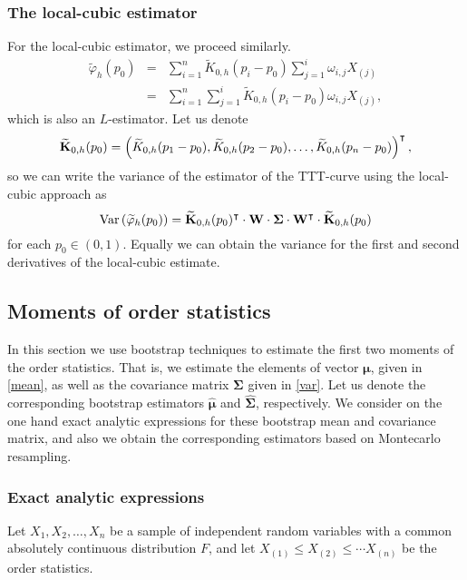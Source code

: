 \documentclass[preprint,12pt]{elsarticle}
\begin{document}
\subsubsection{The local-cubic estimator}

For the local-cubic estimator, we proceed similarly.
\begin{eqnarray*}
\widetilde{\varphi}_h(p_0)&=&\sum_{i=1}^n \widetilde{K}_{0,h}(p_i-p_0)\sum_{j=1}^i\omega_{i,j}X_{(j)} \\
&=& \sum_{i=1}^n \sum_{j=1}^i \widetilde{K}_{0,h}(p_i-p_0)\omega_{i,j}X_{(j)},
\end{eqnarray*}
which is also an $L$-estimator. Let us denote 
$$\widetilde{\bf K}_{0,h}(p_0)=\left(\widetilde{ K}_{0,h}(p_1-p_0), \widetilde{ K}_{0,h}(p_2-p_0),\ldots,\widetilde{ K}_{0,h}(p_n-p_0)\right)^{\intercal},$$
 so we can write the variance of the estimator of the TTT-curve using the local-cubic approach as
\begin{equation}\label{V.phi0.cubic}
{\rm Var} \left(\widetilde{\varphi}_h(p_0)\right)= \widetilde{\bf K}_{0,h}(p_0)^{\intercal}\cdot {\bf W} \cdot {\boldsymbol{\Sigma}}\cdot  {\bf W}^{\intercal}\cdot \widetilde{\bf K}_{0,h}(p_0)
\end{equation}
for each $p_0 \in (0,1)$. Equally we can obtain the variance for the first and second derivatives of the local-cubic estimate.

\bigskip
\subsection{Moments of order statistics}

In this section we use bootstrap techniques to estimate the first two moments of the order statistics. That is, we estimate the elements of vector $\boldsymbol{\mu}$, given in \eqref{mean}, as well as the covariance matrix $\boldsymbol{\Sigma}$ given in \eqref{var}. Let us denote the corresponding bootstrap estimators $\widehat{\boldsymbol{\mu}}$ and $\widehat{\boldsymbol{\Sigma}}$, respectively.  We consider on the one hand exact analytic expressions for these bootstrap mean and covariance matrix, and also we obtain the corresponding estimators based on Montecarlo resampling. 

\subsubsection{Exact analytic expressions}

Let $X_1,X_2,\ldots, X_n$ be a sample of independent random variables with a common absolutely continuous distribution $F$, and let  $X_{(1)} \leq X_{(2)}\leq \cdots X_{(n)}$ be the order statistics. 
\end{document}
